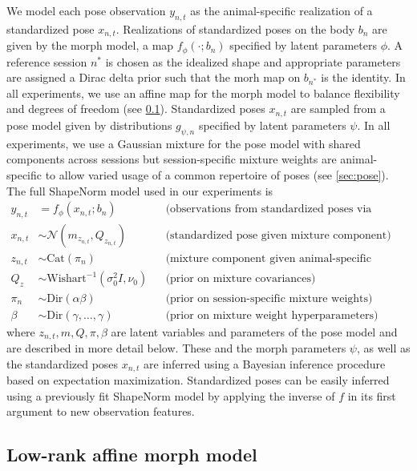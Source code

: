 \documentclass{article}         %
\newcommand{\NN}{\mathcal{N}}
\begin{document}
We model each pose observation $y_{n,t}$ as the animal-specific realization of a standardized pose $x_{n,t}$. Realizations of standardized poses on the body $b_n$ are given by the morph model, a map $f_\phi(\cdot; b_n)$ specified by latent parameters $\phi$. A reference session $n^*$ is chosen as the idealized shape and appropriate parameters are assigned a Dirac delta prior such that the morh map on $b_{n^*}$ is the identity. In all experiments, we use an affine map for the morph model to balance flexibility and degrees of freedom (see \ref{sec:morph}). Standardized poses $x_{n, t}$ are sampled from a pose model given by distributions $g_{\psi, n}$ specified by latent parameters $\psi$. In all experiments, we use a Gaussian mixture for the pose model with shared components across sessions but session-specific mixture weights are animal-specific to allow varied usage of a common repertoire of poses (see \ref{sec:pose}). The full ShapeNorm model used in our experiments is
%
\begin{align*}
    y_{n,t} & = f_{\phi}(x_{n,t}; b_n)
        && \text{(observations from standardized poses via morph model)} \\
    x_{n,t} & \sim \NN(m_{z_{n,t}}, Q_{z_{n,t}}) 
        && \text{(standardized pose given mixture component)}  \\
    z_{n,t} & \sim \text{Cat}(\pi_n)  
        && \text{(mixture component given animal-specific weights)} \\
    Q_z & \sim \text{Wishart}^{-1}(\sigma^2_0 I, \nu_0) 
        && \text{(prior on mixture covariances)} \\
    \pi_n & \sim \text{Dir}(\alpha \beta)
        && \text{(prior on session-specific mixture weights)} \\
    \beta & \sim \text{Dir}(\gamma,\dots,\gamma)
        && \text{(prior on mixture weight hyperparameters)}
\end{align*}
%
where $z_{n, t}, m, Q, \pi, \beta$ are latent variables and parameters of the pose model and are described in more detail below. These and the morph parameters $\psi$, as well as the standardized poses $x_{n, t}$ are inferred using a Bayesian inference procedure based on expectation maximization. Standardized poses can be easily inferred using a previously fit ShapeNorm model by applying the inverse of $f$ in its first argument to new observation features.


\subsection{Low-rank affine morph model}
\label{sec:morph}
\end{document}
